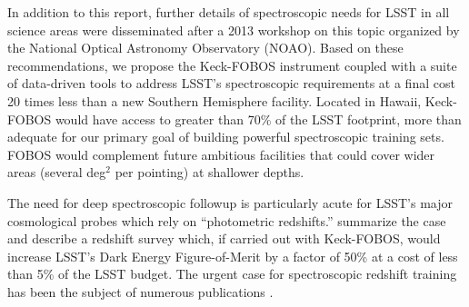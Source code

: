 \documentclass[oneside,11pt]{amsart}
\begin{document}


In addition to this report, further details of spectroscopic needs for LSST in all science areas were disseminated
after a 2013 workshop on this topic organized by the National Optical
Astronomy Observatory (NOAO).  Based on these recommendations, we propose the Keck-FOBOS instrument coupled
with a suite of data-driven tools to address LSST's spectroscopic requirements at a final cost 20 times less than
a new Southern Hemisphere facility. Located in Hawaii, Keck-FOBOS would have access to greater than 70\% of the LSST
footprint, more than adequate for our primary goal of building powerful spectroscopic training sets.  FOBOS would complement future ambitious facilities that could cover wider areas (several deg$^2$ per pointing) at shallower depths.

The need for deep spectroscopic followup is particularly acute for LSST's major cosmological probes which rely on ``photometric redshifts.''  \citet{newman15} summarize the case and describe a redshift survey which, if carried out with Keck-FOBOS, would increase LSST's Dark Energy Figure-of-Merit by a factor of 50\% at a cost of less than 5\% of the LSST budget.  The urgent case for spectroscopic redshift training has been the subject of numerous publications \citep[e.g.,][]{laureijs11,masters15, hemmati18}.  
\end{document}
